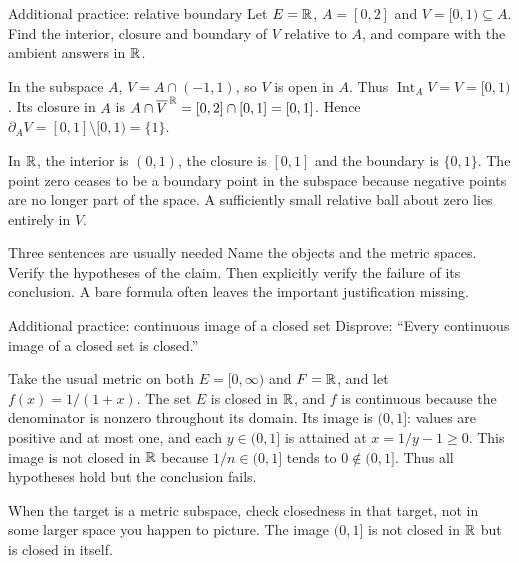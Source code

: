 \begin{exam}{Additional practice: relative boundary}
Let $E=\mathbb R$, $A=[0,2]$ and $V=[0,1)\subseteq A$. Find the interior, closure and boundary of $V$ relative to $A$, and compare with the ambient answers in $\mathbb R$.
\end{exam}
\begin{answer}
In the subspace $A$, $V=A\cap(-1,1)$, so $V$ is open in $A$. Thus $\operatorname{Int}_A V=V=[0,1)$. Its closure in $A$ is $A\cap\overline{V}^{\,\mathbb R}=[0,2]\cap[0,1]=[0,1]$. Hence $\partial_A V=[0,1]\setminus[0,1)=\{1\}$.

In $\mathbb R$, the interior is $(0,1)$, the closure is $[0,1]$ and the boundary is $\{0,1\}$. The point zero ceases to be a boundary point in the subspace because negative points are no longer part of the space. A sufficiently small relative ball about zero lies entirely in $V$.
\end{answer}


\begin{method}{Three sentences are usually needed}
Name the objects and the metric spaces. Verify the hypotheses of the claim. Then explicitly verify the failure of its conclusion. A bare formula often leaves the important justification missing.
\end{method}
\begin{exam}{Additional practice: continuous image of a closed set}
Disprove: ``Every continuous image of a closed set is closed.''
\end{exam}
\begin{answer}
Take the usual metric on both $E=[0,\infty)$ and $F=\mathbb R$, and let $f(x)=1/(1+x)$. The set $E$ is closed in $\mathbb R$, and $f$ is continuous because the denominator is nonzero throughout its domain. Its image is $(0,1]$: values are positive and at most one, and each $y\in(0,1]$ is attained at $x=1/y-1\ge0$. This image is not closed in $\mathbb R$ because $1/n\in(0,1]$ tends to $0\notin(0,1]$. Thus all hypotheses hold but the conclusion fails.
\end{answer}
\begin{tip}
When the target is a metric subspace, check closedness in that target, not in some larger space you happen to picture. The image $(0,1]$ is not closed in $\mathbb R$ but is closed in itself.
\end{tip}


